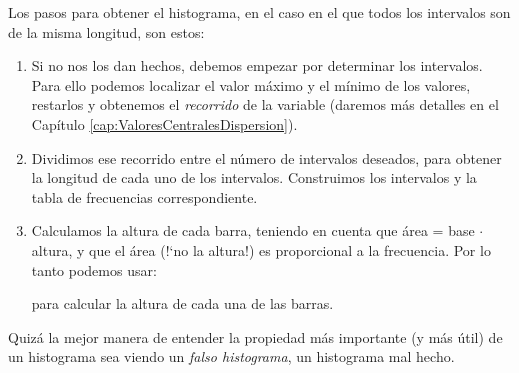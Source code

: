 Los pasos para obtener el histograma, en el caso en el que todos los intervalos son de la misma longitud, son estos:
\begin{enumerate}

      \item Si no nos los dan hechos, debemos empezar por determinar los
      intervalos.  Para ello podemos localizar el valor máximo y el mínimo de
      los valores, restarlos y obtenemos el {\em recorrido} de la variable (daremos más detalles en el Capítulo \ref{cap:ValoresCentralesDispersion}).

      \item Dividimos ese recorrido entre el número de intervalos deseados,	
      para obtener la longitud de cada uno de los intervalos. Construimos los
      intervalos y la tabla de frecuencias correspondiente.

      \item Calculamos la altura de cada barra, teniendo en cuenta que
      área = base $\cdot$ altura, y que el área ({!`}no la altura!) es proporcional a
      la frecuencia. Por lo tanto podemos usar:

        \begin{center}
        \end{center}
para calcular la altura de cada una de las barras.
\end{enumerate}
Quizá la mejor manera de entender la propiedad más importante (y más útil) de un histograma sea viendo un {\em falso histograma}, un histograma mal hecho.
